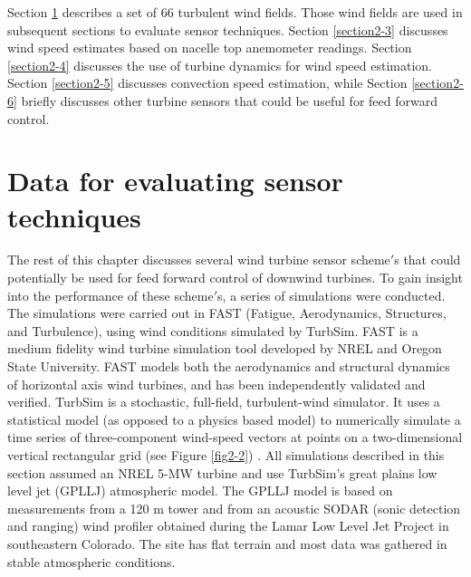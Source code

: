 Section \ref{section2-2} describes a set of 66 turbulent wind fields. Those wind fields are used in subsequent sections to evaluate sensor techniques. Section \ref{section2-3} discusses wind speed estimates based on nacelle top anemometer readings. Section \ref{section2-4} discusses the use of turbine dynamics for wind speed estimation. Section \ref{section2-5} discusses convection speed estimation, while Section \ref{section2-6} briefly discusses other turbine sensors that could be useful for feed forward control.




\section{Data for evaluating sensor techniques} \label{section2-2}

The rest of this chapter discusses several wind turbine sensor scheme$'$s that could potentially be used for feed forward control of downwind turbines. To gain insight into the performance of these scheme$'$s, a series of simulations were conducted. The simulations were carried out in FAST (Fatigue, Aerodynamics, Structures, and Turbulence), using wind conditions simulated by TurbSim. FAST is a medium fidelity wind turbine simulation tool developed by NREL and Oregon State University. FAST models both the aerodynamics and structural dynamics of horizontal axis wind turbines, and has been independently validated and verified\cite{manjock2005}. TurbSim is a stochastic, full-field, turbulent-wind simulator. It uses a statistical model (as opposed to a physics based model) to numerically simulate a time series of three-component wind-speed vectors at points on a two-dimensional vertical rectangular grid (see Figure \ref{fig2-2}) \cite{jonkman2012}. All simulations described in this section assumed an NREL 5-MW turbine and use TurbSim's great plains low level jet (GPLLJ) atmospheric model. The GPLLJ model is based on measurements from a 120 m tower and from an acoustic SODAR (sonic detection and ranging) wind profiler obtained during the Lamar Low Level Jet Project in southeastern Colorado.\cite{kelley2004} The site has flat terrain and most data was gathered in stable atmospheric conditions.


